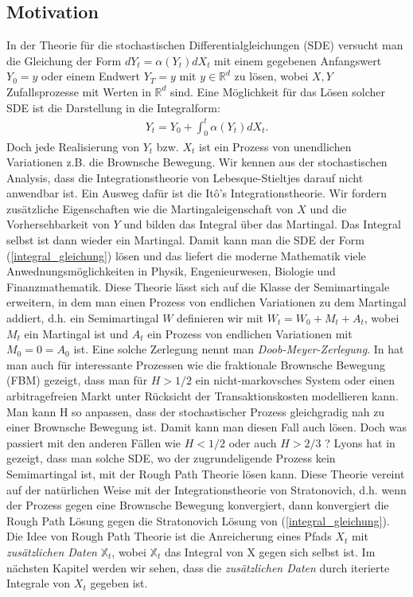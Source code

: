 \documentclass[12pt,titlepage,headsepline]{article}
\begin{document}
      \subsection{Motivation}
      In der Theorie für die stochastischen Differentialgleichungen (SDE) versucht man die Gleichung der Form $dY_t = \alpha(Y_t)dX_t$ mit einem gegebenen Anfangswert $Y_0 = y$ oder einem Endwert $Y_T = y$ mit $y\in \mathbb{R}^d$ zu lösen, wobei $X, Y$ Zufallsprozesse mit Werten in $\mathbb{R}^d$ sind. Eine Möglichkeit für das Lösen solcher SDE ist die Darstellung in die Integralform:
      \begin{align}\label{integral_gleichung}
        Y_t = Y_0 + \int_0^t \alpha(Y_t)dX_t.
      \end{align}
      Doch jede Realisierung von $Y_t$ bzw. $X_t$ ist ein Prozess von unendlichen Variationen z.B. die Brownsche Bewegung. Wir kennen aus der stochastischen Analysis, dass die Integrationstheorie von Lebesque-Stieltjes darauf nicht anwendbar ist. Ein Ausweg dafür ist die Itô's Integrationstheorie. Wir fordern zusätzliche Eigenschaften wie die Martingaleigenschaft von $X$ und die Vorhersehbarkeit von $Y$ und bilden das Integral über das Martingal. Das Integral selbst ist dann wieder ein Martingal. Damit kann man die SDE der Form (\ref{integral_gleichung}) lösen und das liefert die moderne Mathematik viele Anwednungsmöglichkeiten in Physik, Engenieurwesen, Biologie und Finanzmathematik. Diese Theorie lässt sich auf die Klasse der Semimartingale erweitern, in dem man einen Prozess von endlichen Variationen zu dem Martingal addiert, d.h. ein Semimartingal $W$ definieren wir mit $W_t = W_0 + M_t + A_t$, wobei $M_t$ ein Martingal ist und $A_t$ ein Prozess von endlichen Variationen mit $M_0 = 0 = A_0$ ist. Eine solche Zerlegung nennt man \textit{Doob-Meyer-Zerlegung}.
      \hfill\break
      In \cite{friz_multidimensional_2009} hat man auch für interessante Prozessen wie die fraktionale Brownsche Bewegung (FBM) gezeigt, dass man für $H > 1/2$ ein nicht-markovsches System oder einen arbitragefreien Markt unter Rücksicht der Transaktionskosten modellieren kann. Man kann H so anpassen, dass der stochastischer Prozess gleichgradig nah zu einer Brownsche Bewegung ist. Damit kann man diesen Fall auch lösen. Doch was passiert mit den anderen Fällen wie $H < 1/2$ oder auch $H > 2/3$ ?
      \hfill\break
      Lyons hat in \cite{lyons_differential_2007} gezeigt, dass man solche SDE, wo der zugrundeligende Prozess kein Semimartingal ist, mit der Rough Path Theorie lösen kann. Diese Theorie vereint auf der natürlichen Weise mit der Integrationstheorie von Stratonovich, d.h. wenn der Prozess gegen eine Brownsche Bewegung konvergiert, dann konvergiert die Rough Path Lösung gegen die Stratonovich Lösung von (\ref{integral_gleichung}). Die Idee von Rough Path Theorie ist die Anreicherung eines Pfads $X_t$ mit \textit{zusätzlichen Daten} $\mathbb{X}_t$, wobei $\mathbb{X}_t$ das Integral von X gegen sich selbst ist. Im nächsten Kapitel werden wir sehen, dass die \textit{zusätzlichen Daten} durch iterierte Integrale von $X_t$ gegeben ist.
\end{document}

